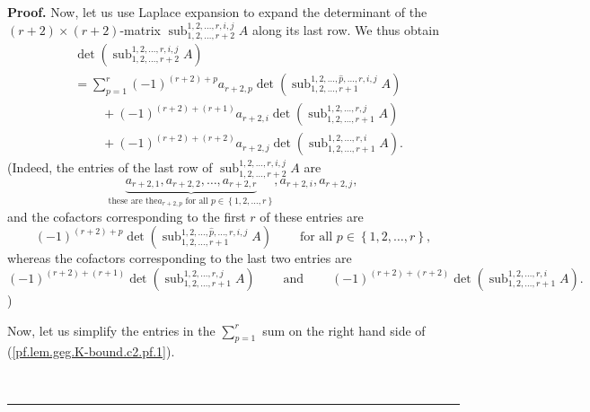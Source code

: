 \documentclass[numbers=enddot,12pt,final,onecolumn,notitlepage]{scrartcl}%
\theoremstyle{definition}
\newenvironment{proof}[1][Proof]{\noindent\textbf{#1.} }{\ \rule{0.5em}{0.5em}}
\let\sumnonlimits\sum
\renewcommand{\sum}{\sumnonlimits\limits}
\theoremstyle{plainsl}
\begin{document}
\begin{proof}
Now, let us use Laplace expansion to expand the determinant of the $\left(
r+2\right)  \times\left(  r+2\right)  $-matrix $\operatorname*{sub}%
\nolimits_{1,2,\ldots,r+2}^{1,2,\ldots,r,i,j}A$ along its last row. We thus
obtain%
\begin{align}
&  \det\left(  \operatorname*{sub}\nolimits_{1,2,\ldots,r+2}^{1,2,\ldots
,r,i,j}A\right) \nonumber\\
&  =\sum_{p=1}^{r}\left(  -1\right)  ^{\left(  r+2\right)  +p}a_{r+2,p}%
\det\left(  \operatorname*{sub}\nolimits_{1,2,\ldots,r+1}^{1,2,\ldots
,\widehat{p},\ldots,r,i,j}A\right) \nonumber\\
&  \ \ \ \ \ \ \ \ \ \ +\left(  -1\right)  ^{\left(  r+2\right)  +\left(
r+1\right)  }a_{r+2,i}\det\left(  \operatorname*{sub}\nolimits_{1,2,\ldots
,r+1}^{1,2,\ldots,r,j}A\right) \nonumber\\
&  \ \ \ \ \ \ \ \ \ \ +\left(  -1\right)  ^{\left(  r+2\right)  +\left(
r+2\right)  }a_{r+2,j}\det\left(  \operatorname*{sub}\nolimits_{1,2,\ldots
,r+1}^{1,2,\ldots,r,i}A\right)  . \label{pf.lem.geg.K-bound.c2.pf.1}%
\end{align}
(Indeed, the entries of the last row of $\operatorname*{sub}%
\nolimits_{1,2,\ldots,r+2}^{1,2,\ldots,r,i,j}A$ are
\[
\underbrace{a_{r+2,1},a_{r+2,2},\ldots,a_{r+2,r}}_{\text{these are the
}a_{r+2,p}\text{ for all }p\in\left\{  1,2,\ldots,r\right\}  },a_{r+2,i}%
,a_{r+2,j},
\]
and the cofactors corresponding to the first $r$ of these entries are%
\[
\left(  -1\right)  ^{\left(  r+2\right)  +p}\det\left(  \operatorname*{sub}%
\nolimits_{1,2,\ldots,r+1}^{1,2,\ldots,\widehat{p},\ldots,r,i,j}A\right)
\ \ \ \ \ \ \ \ \ \ \text{for all }p\in\left\{  1,2,\ldots,r\right\}  ,
\]
whereas the cofactors corresponding to the last two entries are
\[
\left(  -1\right)  ^{\left(  r+2\right)  +\left(  r+1\right)  }\det\left(
\operatorname*{sub}\nolimits_{1,2,\ldots,r+1}^{1,2,\ldots,r,j}A\right)
\ \ \ \ \ \ \ \ \ \ \text{and}\ \ \ \ \ \ \ \ \ \ \left(  -1\right)  ^{\left(
r+2\right)  +\left(  r+2\right)  }\det\left(  \operatorname*{sub}%
\nolimits_{1,2,\ldots,r+1}^{1,2,\ldots,r,i}A\right)  .
\]
)

Now, let us simplify the entries in the $\sum_{p=1}^{r}$ sum on the right hand
side of (\ref{pf.lem.geg.K-bound.c2.pf.1}).


\end{proof}
\end{document}
